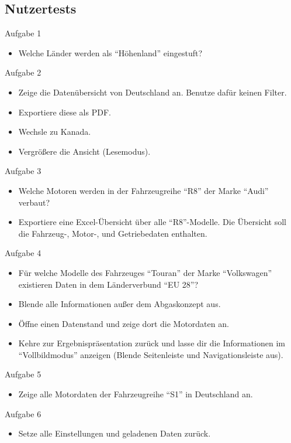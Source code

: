 \subsection{Nutzertests} \label{tasksUser}
Aufgabe 1
\begin{itemize}
	\item Welche Länder werden als \enquote{Höhenland} eingestuft?
\end{itemize}
Aufgabe 2
\begin{itemize}
	\item Zeige die Datenübersicht von Deutschland an. Benutze dafür keinen Filter.
	\item Exportiere diese als PDF.
	\item Wechsle zu Kanada.
	\item Vergrößere die Ansicht (Lesemodus).
\end{itemize}
Aufgabe 3
\begin{itemize}
	\item Welche Motoren werden in der Fahrzeugreihe \enquote{R8} der Marke \enquote{Audi} verbaut?
	\item Exportiere eine Excel-Übersicht über alle \enquote{R8}-Modelle. Die Übersicht soll die Fahrzeug-, Motor-, und Getriebedaten enthalten.
\end{itemize}
Aufgabe 4
\begin{itemize}
	\item Für welche Modelle des Fahrzeuges \enquote{Touran} der Marke \enquote{Volkswagen} existieren Daten in dem Länderverbund \enquote{EU 28}?
	\item Blende alle Informationen außer dem Abgaskonzept aus.
	\item Öffne einen Datenstand und zeige dort die Motordaten an.
	\item Kehre zur Ergebnispräsentation zurück und lasse dir die Informationen im \enquote{Vollbildmodus} anzeigen (Blende Seitenleiste und Navigationsleiste aus). 
\end{itemize}
Aufgabe 5
\begin{itemize}
	\item Zeige alle Motordaten der Fahrzeugreihe \enquote{S1} in Deutschland an.
\end{itemize}
Aufgabe 6
\begin{itemize}
	\item Setze alle Einstellungen und geladenen Daten zurück.
\end{itemize}
